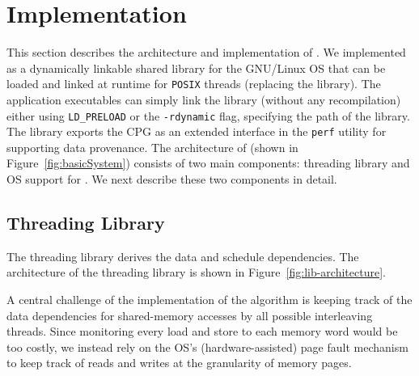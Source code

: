 \section{Implementation}
\label{sec:implementation}



This section describes the architecture and implementation of \projecttitle. We implemented \projecttitle as a dynamically linkable shared library for the GNU/Linux OS that can be loaded and linked  at runtime for {\tt POSIX} threads (replacing the \pthreads library). The application executables can simply link the library (without any recompilation) either using {\tt LD\_PRELOAD} or the {\tt -rdynamic} flag, specifying the path of the \projecttitle library.  The \projecttitle library exports the CPG as an extended interface in the {\tt perf} utility for supporting data provenance.   The architecture of \projecttitle (shown in Figure~\ref{fig:basicSystem}) consists of two main components: threading library and OS support for \intelpt. We next describe these two components in detail.




\subsection{Threading Library}
The threading library derives the data and schedule dependencies. The architecture of the threading library is shown in Figure~\ref{fig:lib-architecture}. 

 
 A central challenge of the implementation of the algorithm is keeping track of the data dependencies for shared-memory accesses by all possible interleaving threads. Since monitoring every load and store to each memory word would be too costly, we instead rely on the OS's (hardware-assisted) page fault mechanism to keep track of reads and writes at the granularity of memory pages.


